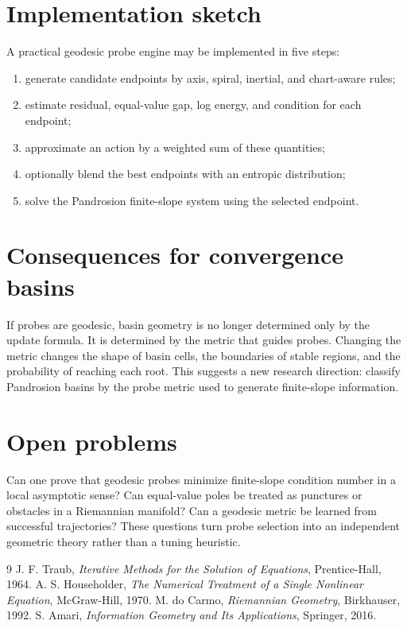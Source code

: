 \documentclass[11pt]{article}
\begin{document}
\section{Implementation sketch}
A practical geodesic probe engine may be implemented in five steps:
\begin{enumerate}[leftmargin=2em]
\item generate candidate endpoints by axis, spiral, inertial, and chart-aware rules;
\item estimate residual, equal-value gap, log energy, and condition for each endpoint;
\item approximate an action by a weighted sum of these quantities;
\item optionally blend the best endpoints with an entropic distribution;
\item solve the Pandrosion finite-slope system using the selected endpoint.
\end{enumerate}

\section{Consequences for convergence basins}
If probes are geodesic, basin geometry is no longer determined only by the update formula.  It is determined by the metric that guides probes.  Changing the metric changes the shape of basin cells, the boundaries of stable regions, and the probability of reaching each root.  This suggests a new research direction: classify Pandrosion basins by the probe metric used to generate finite-slope information.

\section{Open problems}
Can one prove that geodesic probes minimize finite-slope condition number in a local asymptotic sense?  Can equal-value poles be treated as punctures or obstacles in a Riemannian manifold?  Can a geodesic metric be learned from successful trajectories?  These questions turn probe selection into an independent geometric theory rather than a tuning heuristic.

\begin{thebibliography}{9}
 J. F. Traub, \emph{Iterative Methods for the Solution of Equations}, Prentice-Hall, 1964.
 A. S. Householder, \emph{The Numerical Treatment of a Single Nonlinear Equation}, McGraw-Hill, 1970.
 M. do Carmo, \emph{Riemannian Geometry}, Birkhauser, 1992.
 S. Amari, \emph{Information Geometry and Its Applications}, Springer, 2016.
\end{thebibliography}
\end{document}
